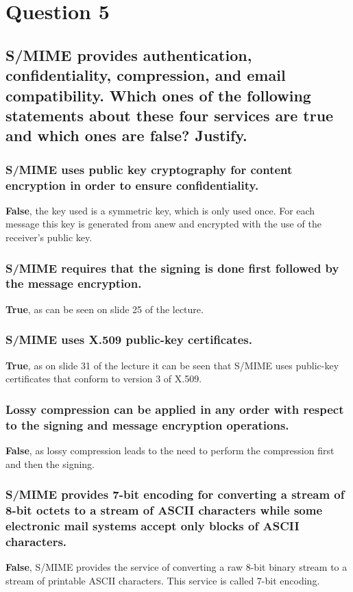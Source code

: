 \documentclass{report}
\begin{document}
	\section{Question 5}
	\startsection
		\renewcommand{\thesubsection}{\thesection.\Alph{subsection}}
		\subsection{S/MIME provides authentication, confidentiality, compression, and email compatibility. Which ones of the following statements about these four services are true and which ones are false? Justify.}
		\startsubsection
			\subsubsection{S/MIME uses public key cryptography for content encryption in order to ensure confidentiality.}
			\startsubsection
				\textbf{False}, the key used is a symmetric key, which is only used once. For each message this key is generated from anew and encrypted with the use of the receiver's public key.
			\closesection
			\subsubsection{S/MIME requires that the signing is done first followed by the message encryption.}
			\startsubsection
				\textbf{True}, as can be seen on slide 25 of the lecture.
			\closesection
			\subsubsection{S/MIME uses X.509 public-key certificates.}
			\startsubsection
				\textbf{True}, as on slide 31 of the lecture it can be seen that S/MIME uses public-key certificates that conform to version 3 of X.509.
			\closesection
			\subsubsection{Lossy compression can be applied in any order with respect to the signing and message encryption operations.}
			\startsubsection
				\textbf{False}, as lossy compression leads to the need to perform the compression first and then the signing.
			\closesection
			\subsubsection{S/MIME provides 7-bit encoding for converting a stream of 8-bit octets to a stream of ASCII characters while some electronic mail systems accept only blocks of ASCII characters.}
			\startsubsection
				\textbf{False}, S/MIME provides the service of converting a raw 8-bit binary stream to a stream of printable ASCII characters. This service is called 7-bit encoding.
			\closesection
		\closesection
	\closesection
\end{document}
